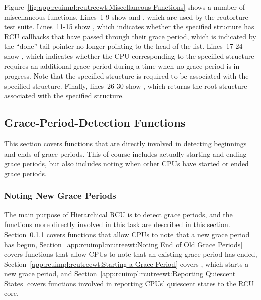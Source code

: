 Figure~\ref{fig:app:rcuimpl:rcutreewt:Miscellaneous Functions}
shows a number of miscellaneous functions.
Lines~1-9 show  and
, which are used by the rcutorture
test suite.
Lines~11-15 show , which
indicates whether the specified  structure has RCU
callbacks that have passed through their grace period, which
is indicated by the ``done'' tail pointer no longer pointing
to the head of the list.
Lines~17-24 show , which indicates
whether the CPU corresponding to the specified 
structure requires an additional grace period during a time when
no grace period is in progress.
Note that the specified  structure is required
to be associated with the specified  structure.
Finally, lines~26-30 show , which returns
the root  structure associated with the specified
 structure.

\subsection{Grace-Period-Detection Functions}
\label{app:rcuimpl:rcutreewt:Grace-Period-Detection Functions}

This section covers functions that are directly involved in detecting
beginnings and ends of grace periods.
This of course includes actually starting and ending grace periods,
but also includes noting when other CPUs have started or ended
grace periods.

\subsubsection{Noting New Grace Periods}
\label{app:rcuimpl:rcutreewt:Noting New Grace Periods}

The main purpose of Hierarchical RCU is to detect grace periods,
and the functions more directly involved in this task are described
in this section.
Section~\ref{app:rcuimpl:rcutreewt:Noting New Grace Periods}
covers functions that allow CPUs to note that a new grace period has
begun,
Section~\ref{app:rcuimpl:rcutreewt:Noting End of Old Grace Periods}
covers functions that allow CPUs to note that an existing grace period
has ended,
Section~\ref{app:rcuimpl:rcutreewt:Starting a Grace Period}
covers , which starts a new grace period, and
Section~\ref{app:rcuimpl:rcutreewt:Reporting Quiescent States}
covers functions involved in reporting CPUs' quiescent states to
the RCU core.

